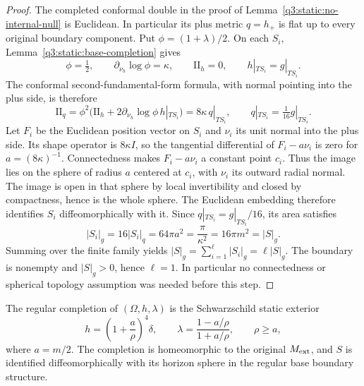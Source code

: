 \begin{proof}
The completed conformal double in the proof of
Lemma~\ref{q3:static:no-internal-null} is Euclidean. In particular its
plus metric $q=h_+$ is flat up to every original boundary component.
Put $\phi=(1+\lambda)/2$. On each $S_i$,
Lemma~\ref{q3:static:base-completion} gives
\[
\phi=\tfrac12,\qquad
\partial_{\nu_h}\log\phi=\kappa,\qquad
\mathrm{II}_h=0,\qquad h|_{TS_i}=g|_{TS_i}.
\]
The conformal second-fundamental-form formula, with normal pointing
into the plus side, is therefore
\[
\mathrm{II}_q
 =\phi^2\bigl(\mathrm{II}_h+
 2\partial_{\nu_h}\log\phi\,h|_{TS_i}\bigr)
 =8\kappa\,q|_{TS_i},
 \qquad q|_{TS_i}=\tfrac1{16}g|_{TS_i}.
\]
Let $F_i$ be the Euclidean position vector on $S_i$ and $\nu_i$
its unit normal into the plus side. Its shape operator is
$8\kappa I$, so the tangential differential of $F_i-a\nu_i$ is
zero for $a=(8\kappa)^{-1}$. Connectedness makes $F_i-a\nu_i$
a constant point $c_i$. Thus the image lies on the sphere of radius
$a$ centered at $c_i$, with $\nu_i$ its outward radial normal.
The image is open in that sphere by local invertibility and closed
by compactness, hence is the whole sphere. The Euclidean embedding
therefore identifies $S_i$ diffeomorphically with it.
Since $q|_{TS_i}=g|_{TS_i}/16$, its area satisfies
\begin{equation}
\label{q3:static:individual-boundary-area}
|S_i|_g=16|S_i|_q=64\pi a^2
 =\frac{\pi}{\kappa^2}=16\pi m^2=|S|_g.
\end{equation}
Summing over the finite family yields
$|S|_g=\sum_{i=1}^{\ell}|S_i|_g=\ell|S|_g$. The boundary is nonempty
and $|S|_g>0$, hence $\ell=1$. In particular no connectedness or spherical
topology assumption was needed before this step.
\end{proof}

\begin{lemma}
\label{q3:static:schwarzschild-base}
The regular completion of \((\Omega,h,\lambda)\) is the
Schwarzschild static exterior
\begin{equation}
\label{q3:static:isotropic-base}
h=\left(1+\frac a\rho\right)^4\delta,\qquad
\lambda=\frac{1-a/\rho}{1+a/\rho},\qquad
\rho\geq a,
\end{equation}
where \(a=m/2\).
The completion is homeomorphic to the original \(M_{\mathrm{ext}}\),
and \(S\) is identified diffeomorphically with its horizon sphere
in the regular base boundary structure.
\end{lemma}

